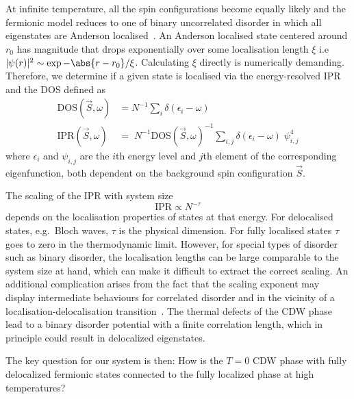 At infinite temperature, all the spin configurations become equally likely and the fermionic model reduces to one of binary uncorrelated disorder in which all eigenstates are Anderson localised~\autocite{abrahamsScalingTheoryLocalization1979}. An Anderson localised state centered around \(r_0\) has magnitude that drops exponentially over some localisation length \(\xi\) i.e \(|\psi(r)|^2 \sim \exp{-\abs{r - r_0}/\xi}\). Calculating \(\xi\) directly is numerically demanding. Therefore, we determine if a given state is localised via the energy-resolved IPR and the DOS defined as \[\begin{aligned}
\mathrm{DOS}(\vec{S}, \omega)& = N^{-1} \sum_{i} \delta(\epsilon_i - \omega)\\
\mathrm{IPR}(\vec{S}, \omega)& = \; N^{-1} \mathrm{DOS}(\vec{S}, \omega)^{-1} \sum_{i,j} \delta(\epsilon_i - \omega)\;\psi^{4}_{i,j}\end{aligned}\] where \(\epsilon_i\) and \(\psi_{i,j}\) are the \(i\)th energy level and \(j\)th element of the corresponding eigenfunction, both dependent on the background spin configuration \(\vec{S}\).

The scaling of the IPR with system size \[\mathrm{IPR} \propto N^{-\tau}\] depends on the localisation properties of states at that energy. For delocalised states, e.g.~Bloch waves, \(\tau\) is the physical dimension. For fully localised states \(\tau\) goes to zero in the thermodynamic limit. However, for special types of disorder such as binary disorder, the localisation lengths can be large comparable to the system size at hand, which can make it difficult to extract the correct scaling. An additional complication arises from the fact that the scaling exponent may display intermediate behaviours for correlated disorder and in the vicinity of a localisation-delocalisation transition~\autocite{kramerLocalizationTheoryExperiment1993,eversAndersonTransitions2008a}. The thermal defects of the CDW phase lead to a binary disorder potential with a finite correlation length, which in principle could result in delocalized eigenstates.

The key question for our system is then: How is the \(T=0\) CDW phase with fully delocalized fermionic states connected to the fully localized phase at high temperatures?

